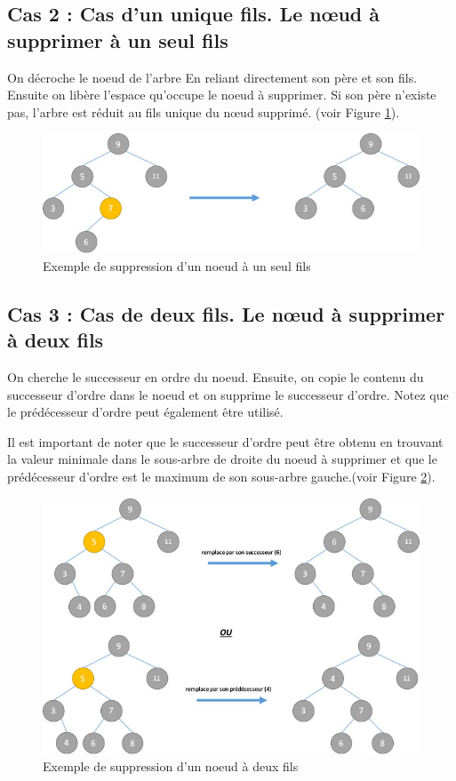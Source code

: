 \subsection{Cas 2 : Cas d’un unique fils. Le nœud à supprimer à un seul fils}
On décroche le noeud de l’arbre En reliant directement son père et son fils. Ensuite on libère l'espace qu'occupe le noeud à supprimer. Si son père n’existe pas, l’arbre est réduit au fils unique du nœud supprimé.  (voir Figure \ref{fig:d2}).
\begin{figure}[H]
    \centering
        \includegraphics[scale=0.7]{./ressources/d2.jpeg}
        \caption{Exemple de suppression d'un noeud à un seul fils}
    \label{fig:d2}
\end{figure}

\subsection{Cas 3 : Cas de deux fils. Le nœud à supprimer à deux fils}
On cherche le successeur en ordre du noeud. Ensuite, on copie le contenu du successeur d'ordre dans le noeud et on supprime le successeur d'ordre. Notez que le prédécesseur d'ordre peut également être utilisé.
\par
Il est important de noter que le successeur d'ordre peut être obtenu en trouvant la valeur minimale dans le sous-arbre de droite du noeud à supprimer et que le prédécesseur d'ordre est le maximum de son sous-arbre gauche.(voir Figure \ref{fig:d3}).
\begin{figure}[H]
    \centering
        \includegraphics[scale=0.6]{./ressources/d3.jpeg}
        \caption{Exemple de suppression d'un noeud à deux fils}
    \label{fig:d3}
\end{figure}
\par


